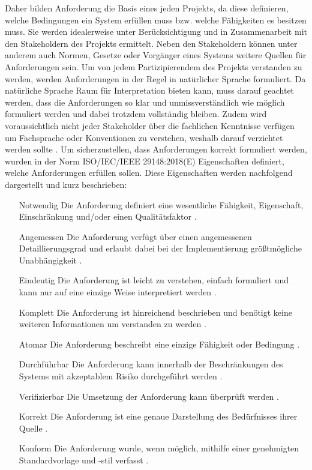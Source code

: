 Daher bilden Anforderung die Basis eines jeden Projekts, da diese definieren, welche Bedingungen ein System erfüllen muss bzw. welche Fähigkeiten 
es besitzen muss. Sie werden idealerweise unter Berücksichtigung und in Zusammenarbeit mit den Stakeholdern des Projekts ermittelt. Neben den 
Stakeholdern können unter anderem auch Normen, Gesetze oder Vorgänger eines Systems weitere Quellen für Anforderungen sein. Um von jedem 
Partizipierendem des Projekts verstanden zu werden, werden Anforderungen in der Regel in natürlicher Sprache formuliert. Da natürliche Sprache Raum für 
Interpretation bieten kann, muss darauf geachtet werden, dass die Anforderungen so klar und unmissverständlich wie möglich formuliert werden und dabei 
trotzdem vollständig bleiben. Zudem wird voraussichtlich nicht jeder Stakeholder über die fachlichen Kenntnisse verfügen um Fachsprache oder 
Konventionen zu verstehen, weshalb darauf verzichtet werden sollte \cite[vgl. S.2]{DOORS}. Um sicherzustellen, dass Anforderungen korrekt 
formuliert werden, wurden in der Norm ISO/IEC/IEEE 29148:2018(E) Eigenschaften definiert, welche Anforderungen erfüllen sollen. 
Diese Eigenschaften werden nachfolgend dargestellt und kurz beschrieben:

\begin{enumerate}[leftmargin=*,labelindent=16pt,font=\bfseries, nolistsep]
    \item[Notwendig] Die Anforderung definiert eine wesentliche Fähigkeit, Eigenschaft, Einschränkung und/oder einen Qualitätsfaktor \cite[vgl. S.12]{RE-ISO}.
    \item[Angemessen] Die Anforderung verfügt über einen angemessenen Detaillierungsgrad und erlaubt dabei bei der Implementierung größtmögliche Unabhängigkeit \cite[vgl. S.12]{RE-ISO}.
    \item[Eindeutig] Die Anforderung ist leicht zu verstehen, einfach formuliert und kann nur auf eine einzige Weise interpretiert werden \cite[vgl. S.12]{RE-ISO}.
    \item[Komplett] Die Anforderung ist hinreichend beschrieben und benötigt keine weiteren Informationen um verstanden zu werden \cite[vgl. S.12]{RE-ISO}.
    \item[Atomar] Die Anforderung beschreibt eine einzige Fähigkeit oder Bedingung \cite[vgl. S.12]{RE-ISO}.
    \item[Durchführbar] Die Anforderung kann innerhalb der Beschränkungen des Systems mit akzeptablem Risiko durchgeführt werden \cite[vgl. S.13]{RE-ISO}.
    \item[Verifizierbar] Die Umsetzung der Anforderung kann überprüft werden \cite[vgl. S.13]{RE-ISO}.
    \item[Korrekt] Die Anforderung ist eine genaue Darstellung des Bedürfnisses ihrer Quelle \cite[vgl. S.13]{RE-ISO}.
    \item[Konform] Die Anforderung wurde, wenn möglich, mithilfe einer genehmigten Standardvorlage und -stil verfasst \cite[vgl. S.13]{RE-ISO}.
\end{enumerate}

